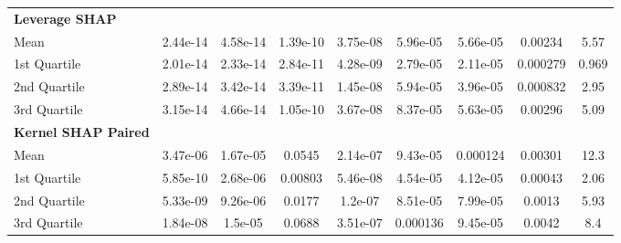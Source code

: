 {\begin{tabular} {lcccccccc}
\addlinespace[1ex] 
\textbf{Leverage SHAP} &  &  &  &  &  &  &  &  \\ 
\hspace{7pt}Mean & \cellcolor{silver!60}2.44e-14 & \cellcolor{bronze!60}4.58e-14 & \cellcolor{bronze!60}1.39e-10 & \cellcolor{gold!60}3.75e-08 & \cellcolor{gold!60}5.96e-05 & \cellcolor{gold!60}5.66e-05 & \cellcolor{gold!60}0.00234 & \cellcolor{gold!60}5.57 \\ 
\hspace{7pt}1st Quartile & \cellcolor{gold!60}2.01e-14 & \cellcolor{silver!60}2.33e-14 & \cellcolor{silver!60}2.84e-11 & \cellcolor{gold!60}4.28e-09 & \cellcolor{gold!60}2.79e-05 & \cellcolor{gold!60}2.11e-05 & \cellcolor{gold!60}0.000279 & \cellcolor{gold!60}0.969 \\ 
\hspace{7pt}2nd Quartile & \cellcolor{bronze!60}2.89e-14 & \cellcolor{bronze!60}3.42e-14 & \cellcolor{bronze!60}3.39e-11 & \cellcolor{gold!60}1.45e-08 & \cellcolor{gold!60}5.94e-05 & \cellcolor{gold!60}3.96e-05 & \cellcolor{gold!60}0.000832 & \cellcolor{gold!60}2.95 \\ 
\hspace{7pt}3rd Quartile & \cellcolor{gold!60}3.15e-14 & \cellcolor{bronze!60}4.66e-14 & \cellcolor{bronze!60}1.05e-10 & \cellcolor{gold!60}3.67e-08 & \cellcolor{gold!60}8.37e-05 & \cellcolor{gold!60}5.63e-05 & \cellcolor{gold!60}0.00296 & \cellcolor{gold!60}5.09 \\ 
\addlinespace[1ex] 
\textbf{Kernel SHAP Paired} &  &  &  &  &  &  &  &  \\ 
\hspace{7pt}Mean & 3.47e-06 & 1.67e-05 & 0.0545 & \cellcolor{bronze!60}2.14e-07 & \cellcolor{silver!60}9.43e-05 & \cellcolor{bronze!60}0.000124 & \cellcolor{bronze!60}0.00301 & \cellcolor{bronze!60}12.3 \\ 
\hspace{7pt}1st Quartile & 5.85e-10 & 2.68e-06 & 0.00803 & \cellcolor{silver!60}5.46e-08 & \cellcolor{silver!60}4.54e-05 & \cellcolor{silver!60}4.12e-05 & \cellcolor{silver!60}0.00043 & \cellcolor{bronze!60}2.06 \\ 
\hspace{7pt}2nd Quartile & 5.33e-09 & 9.26e-06 & 0.0177 & \cellcolor{bronze!60}1.2e-07 & \cellcolor{silver!60}8.51e-05 & \cellcolor{bronze!60}7.99e-05 & \cellcolor{bronze!60}0.0013 & \cellcolor{bronze!60}5.93 \\ 
\hspace{7pt}3rd Quartile & 1.84e-08 & 1.5e-05 & 0.0688 & 3.51e-07 & \cellcolor{silver!60}0.000136 & \cellcolor{silver!60}9.45e-05 & \cellcolor{bronze!60}0.0042 & \cellcolor{bronze!60}8.4 \\ 

\end{tabular}}
